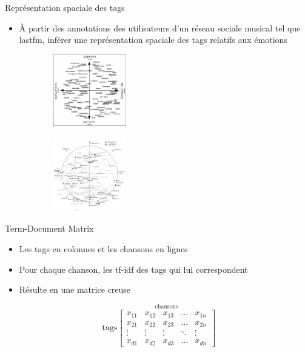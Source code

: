 \documentclass{beamer}
\begin{document}
\begin{frame}{Représentation spaciale des tags}
    \begin{itemize}
        \item À partir des annotations des utilisateurs d'un réseau sociale
            musical tel que lastfm, inférer une représentation spaciale des
            tags relatifs aux
            émotions~~
    \end{itemize}
\begin{figure}
    \begin{subfigure}
    \centering
    \includegraphics[width=120px]{images/scherer_model.png}
    \end{subfigure}
    \hspace{12px}
    \begin{subfigure}
    \centering
    \includegraphics[width=120px]{images/result_mood_space.png}
    \end{subfigure}

\end{figure}
\end{frame}

\begin{frame}{Term-Document Matrix}
    \begin{itemize}
        \item Les tags en colonnes et les chansons en lignes
        \item Pour chaque chanson, les tf-idf des tags qui lui correspondent
        \item Résulte en une matrice creuse
    \end{itemize}

    \[
        \textrm{ tags}
        \stackrel{\mbox{chansons}}{
    \begin{bmatrix}
            x_{11} & x_{12} & x_{13} & \dots  & x_{1n} \\
            x_{21} & x_{22} & x_{23} & \dots  & x_{2n} \\
            \vdots & \vdots & \vdots & \ddots & \vdots \\
            x_{d1} & x_{d2} & x_{d3} & \dots  & x_{dn}
    \end{bmatrix}
}
\]

\end{frame}
\end{document}
